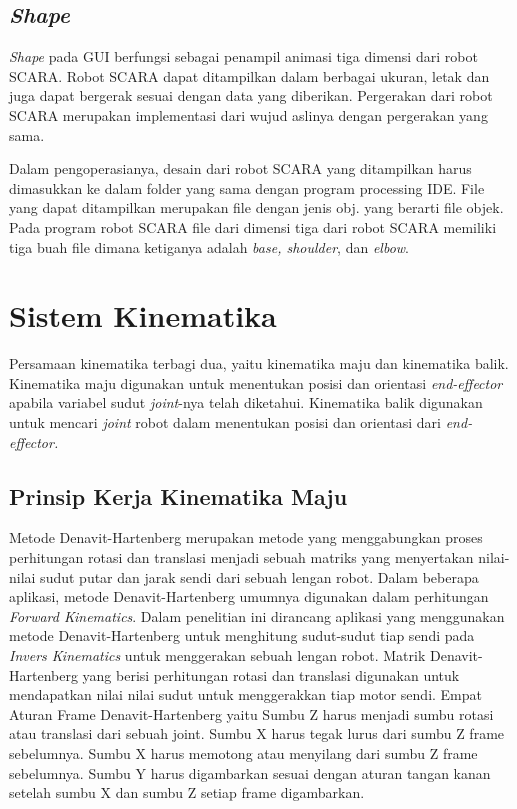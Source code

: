 \subsection{\textit{Shape}}
\textit{Shape} pada GUI berfungsi sebagai penampil animasi tiga dimensi dari robot SCARA. Robot SCARA dapat ditampilkan dalam berbagai ukuran, letak dan juga dapat bergerak sesuai dengan data yang diberikan. Pergerakan dari robot SCARA merupakan implementasi dari wujud aslinya dengan pergerakan yang sama.

Dalam pengoperasianya, desain dari robot SCARA yang ditampilkan harus dimasukkan ke dalam folder yang sama dengan program processing IDE. File yang dapat ditampilkan merupakan file dengan jenis obj. yang berarti file objek. Pada program robot SCARA file dari dimensi tiga dari robot SCARA memiliki tiga buah file dimana ketiganya adalah \textit{base, shoulder}, dan \textit{elbow}. 

\section{Sistem Kinematika}
Persamaan kinematika terbagi dua, yaitu kinematika maju dan kinematika balik. Kinematika maju digunakan untuk menentukan posisi dan orientasi \textit{end-effector} apabila variabel sudut \textit{joint}-nya telah diketahui. Kinematika balik digunakan untuk mencari \textit{joint} robot dalam menentukan posisi dan orientasi dari \textit{end-effector.}
\subsection{Prinsip Kerja Kinematika Maju}
Metode Denavit-Hartenberg merupakan metode yang menggabungkan proses perhitungan rotasi dan translasi menjadi sebuah matriks yang menyertakan nilai-nilai sudut putar dan jarak sendi dari sebuah lengan robot. Dalam beberapa aplikasi, metode Denavit-Hartenberg umumnya digunakan dalam perhitungan \textit{Forward Kinematics}. Dalam penelitian ini dirancang aplikasi yang menggunakan metode Denavit-Hartenberg untuk menghitung sudut-sudut tiap sendi pada \textit{Invers Kinematics} untuk menggerakan sebuah lengan robot. Matrik Denavit-Hartenberg yang berisi perhitungan rotasi dan translasi digunakan untuk mendapatkan nilai nilai sudut untuk menggerakkan tiap motor sendi. Empat Aturan Frame Denavit-Hartenberg yaitu Sumbu Z harus menjadi sumbu rotasi atau translasi dari sebuah joint. Sumbu X harus tegak lurus dari sumbu Z frame sebelumnya. Sumbu X harus memotong atau menyilang dari sumbu Z frame sebelumnya. Sumbu Y harus digambarkan sesuai dengan aturan tangan kanan setelah sumbu X   dan sumbu Z setiap frame digambarkan.
